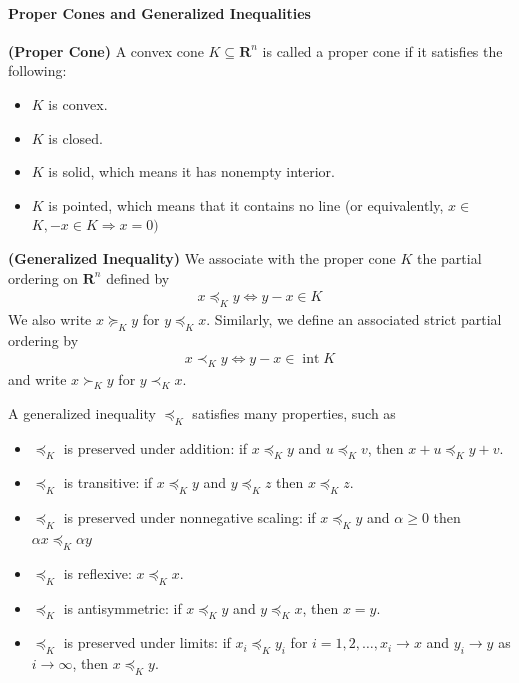 \documentclass{article}
\newcommand{\bfs}[1]{\textbf{({#1}) }}
\begin{document}
\paragraph{Proper Cones and Generalized Inequalities}
\begin{defa}{\bfs{Proper Cone}}
 A convex cone $K \subseteq \mathbf{R}^{n}$ is called a proper cone if it satisfies the following:
\begin{itemize}
    \item $K$ is convex.
    \item $K$ is closed.
    \item $K$ is solid, which means it has nonempty interior.
    \item $K$ is pointed, which means that it contains no line (or equivalently, $x \in$ $K,-x \in K \Longrightarrow x=0)$
\end{itemize}
\end{defa}
\begin{defa}{\bfs{Generalized Inequality}}
 We associate with the proper cone $K$ the partial ordering on $\mathbf{R}^{n}$ defined by
\begin{align*}
x \preceq_{K} y \Longleftrightarrow y-x \in K
\end{align*}
We also write $x \succeq_{K} y$ for $y \preceq_{K} x$. Similarly, we define an associated strict partial ordering by
\begin{align*}
x \prec_{K} y \Longleftrightarrow y-x \in \operatorname{int} K
\end{align*}
and write $x \succ_{K} y$ for $y \prec_{K} x$.
\end{defa}

A generalized inequality $\preceq_{K}$ satisfies many properties, such as
\begin{itemize}
    \item $\preceq_{K}$ is preserved under addition: if $x \preceq_{K} y$ and $u \preceq_{K} v$, then $x+u \preceq_{K} y+v$.
    \item $\preceq_{K}$ is transitive: if $x \preceq_{K} y$ and $y \preceq_{K} z$ then $x \preceq_{K} z$.
    \item $\preceq_{K}$ is preserved under nonnegative scaling: if $x \preceq_{K} y$ and $\alpha \geq 0$ then $\alpha x \preceq_{K} \alpha y$
    \item $\preceq_{K}$ is reflexive: $x \preceq_{K} x$.
    \item $\preceq_{K}$ is antisymmetric: if $x \preceq_{K} y$ and $y \preceq_{K} x$, then $x=y$.
    \item $\preceq_{K}$ is preserved under limits: if $x_{i} \preceq_{K} y_{i}$ for $i=1,2, \ldots, x_{i} \rightarrow x$ and $y_{i} \rightarrow y$ as $i \rightarrow \infty$, then $x \preceq_{K} y$.
\end{itemize}
\end{document}
